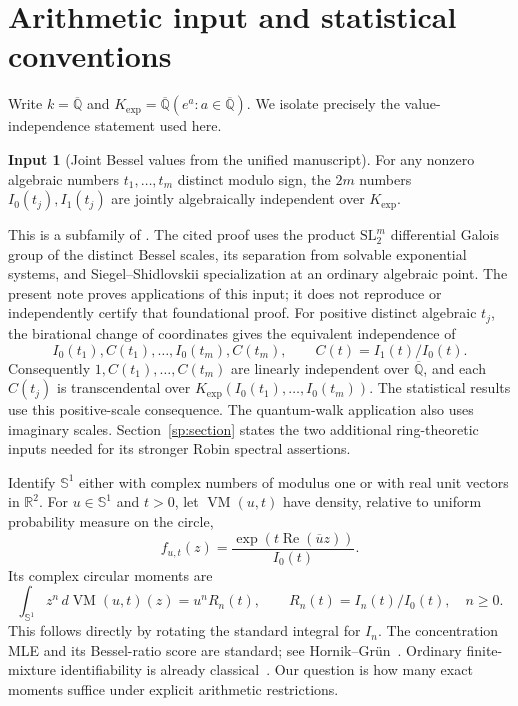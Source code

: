 \documentclass[11pt]{article}
\theoremstyle{definition}
\newtheorem{sourceinput}[theorem]{Input}
\theoremstyle{remark}
\newcommand{\kk}{\overline{\mathbb Q}}
\newcommand{\Kexp}{K_{\mathrm{exp}}}
\newcommand{\VM}{\operatorname{VM}}
\newcommand{\Sone}{\mathbb S^1}
\begin{document}
\section{Arithmetic input and statistical conventions}


Write $k=\overline{\mathbb Q}$ and
$\Kexp=\kk(e^a:a\in\kk)$.
We isolate precisely the value-independence statement used here.

\begin{sourceinput}[Joint Bessel values from the unified manuscript]
\label{xf:input}\label{cf:joint}
For any nonzero algebraic numbers $t_1,\ldots,t_m$ distinct modulo sign,
the $2m$ numbers $I_0(t_j),I_1(t_j)$ are jointly algebraically
independent over $\Kexp$.
\end{sourceinput}

This is a subfamily of \cite[Theorem 3.3]{Unified}.
The cited proof uses the product $\mathrm{SL}_2^m$ differential Galois
group of the distinct Bessel scales, its separation from solvable
exponential systems, and Siegel--Shidlovskii specialization at an ordinary
algebraic point. The present note proves applications of this input;
it does not reproduce or independently certify that foundational proof.
For positive distinct algebraic $t_j$, the birational change of coordinates
gives the equivalent independence of
\begin{equation}\label{vm:input}
 I_0(t_1),C(t_1),\ldots,I_0(t_m),C(t_m),
 \qquad C(t)=I_1(t)/I_0(t).
\end{equation}
Consequently $1,C(t_1),\ldots,C(t_m)$ are linearly independent over
$\kk$, and each $C(t_j)$ is transcendental over
$\Kexp(I_0(t_1),\ldots,I_0(t_m))$.
The statistical results use this positive-scale consequence.
The quantum-walk application also uses imaginary scales.
Section~\ref{sp:section} states the two additional ring-theoretic inputs
needed for its stronger Robin spectral assertions.

Identify $\Sone$ either with complex numbers of modulus one or with
real unit vectors in $\mathbb R^2$.  For $u\in\Sone$ and $t>0$, let
$\VM(u,t)$ have density, relative to uniform probability measure on the
circle,
\[
 f_{u,t}(z)=\frac{\exp(t\operatorname{Re}(\overline u z))}{I_0(t)}.
\]
Its complex circular moments are
\begin{equation}\label{vm:moment}
 \int_{\Sone} z^n\,d\VM(u,t)(z)=u^nR_n(t),\qquad
 R_n(t)=I_n(t)/I_0(t),\quad n\geq0.
\end{equation}
This follows directly by rotating the standard integral for $I_n$.
The concentration MLE and its Bessel-ratio score are standard; see
Hornik--Gr\"un~\cite{HG}.  Ordinary finite-mixture identifiability is
already classical~\cite{FHW,Kent}.  Our question is how many exact
moments suffice under explicit arithmetic restrictions.
\end{document}
